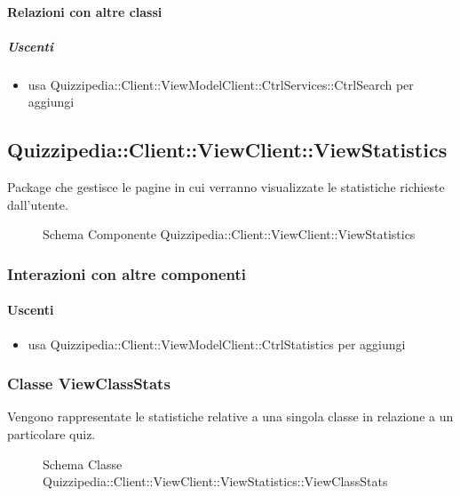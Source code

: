 \paragraph{Relazioni con altre classi}
\subparagraph{Uscenti}
\begin{itemize}
\item usa Quizzipedia::Client::ViewModelClient::CtrlServices::CtrlSearch per aggiungi
\end{itemize}
\subsection{Quizzipedia::Client::ViewClient::ViewStatistics}
Package che gestisce le pagine in cui verranno visualizzate le statistiche richieste dall'utente.
\begin{figure}[H]
\centering
\noindent{}
\caption[Schema Componente Quizzipedia::Client::ViewClient::ViewStatistics]{Schema Componente Quizzipedia::Client::ViewClient::ViewStatistics}
\end{figure}
\subsubsection{Interazioni con altre componenti}
\paragraph{Uscenti}
\begin{itemize}
\item usa Quizzipedia::Client::ViewModelClient::CtrlStatistics per aggiungi
\end{itemize}
\subsubsection{Classe ViewClassStats}
Vengono rappresentate le statistiche relative a una singola classe in relazione a un particolare quiz.
\begin{figure}[H]
\centering
\noindent{}
\caption[Schema Classe ViewClassStats]{Schema Classe Quizzipedia::Client::ViewClient::ViewStatistics::ViewClassStats}
\end{figure}
